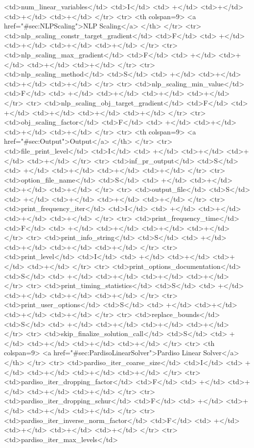 {{<td>num_linear_variables</td>
<td>I</td>
<td> +</td>
<td>+</td>
<td>+</td>
<td>+</td>
</tr>
<tr>   <th colspan=9> <a href="#sec:NLPScaling">NLP Scaling</a> </th>
</tr>
<tr>
<td>nlp_scaling_constr_target_gradient</td>
<td>F</td>
<td> +</td>
<td>+</td>
<td>+</td>
<td>+</td>
</tr>
<tr>
<td>nlp_scaling_max_gradient</td>
<td>F</td>
<td> +</td>
<td>+</td>
<td>+</td>
<td>+</td>
</tr>
<tr>
<td>nlp_scaling_method</td>
<td>S</td>
<td> +</td>
<td>+</td>
<td>+</td>
<td>+</td>
</tr>
<tr>
<td>nlp_scaling_min_value</td>
<td>F</td>
<td> +</td>
<td>+</td>
<td>+</td>
<td>+</td>
</tr>
<tr>
<td>nlp_scaling_obj_target_gradient</td>
<td>F</td>
<td> +</td>
<td>+</td>
<td>+</td>
<td>+</td>
</tr>
<tr>
<td>obj_scaling_factor</td>
<td>F</td>
<td> +</td>
<td>+</td>
<td>+</td>
<td>+</td>
</tr>
<tr>   <th colspan=9> <a href="#sec:Output">Output</a> </th>
</tr>
<tr>
<td>file_print_level</td>
<td>I</td>
<td> +</td>
<td>+</td>
<td>+</td>
<td>+</td>
</tr>
<tr>
<td>inf_pr_output</td>
<td>S</td>
<td> +</td>
<td>+</td>
<td>+</td>
<td>+</td>
</tr>
<tr>
<td>option_file_name</td>
<td>S</td>
<td> +</td>
<td>+</td>
<td>+</td>
<td>+</td>
</tr>
<tr>
<td>output_file</td>
<td>S</td>
<td> +</td>
<td>+</td>
<td>+</td>
<td>+</td>
</tr>
<tr>
<td>print_frequency_iter</td>
<td>I</td>
<td> +</td>
<td>+</td>
<td>+</td>
<td>+</td>
</tr>
<tr>
<td>print_frequency_time</td>
<td>F</td>
<td> +</td>
<td>+</td>
<td>+</td>
<td>+</td>
</tr>
<tr>
<td>print_info_string</td>
<td>S</td>
<td> +</td>
<td>+</td>
<td>+</td>
<td>+</td>
</tr>
<tr>
<td>print_level</td>
<td>I</td>
<td> +</td>
<td>+</td>
<td>+</td>
<td>+</td>
</tr>
<tr>
<td>print_options_documentation</td>
<td>S</td>
<td> +</td>
<td>+</td>
<td>+</td>
<td>+</td>
</tr>
<tr>
<td>print_timing_statistics</td>
<td>S</td>
<td> +</td>
<td>+</td>
<td>+</td>
<td>+</td>
</tr>
<tr>
<td>print_user_options</td>
<td>S</td>
<td> +</td>
<td>+</td>
<td>+</td>
<td>+</td>
</tr>
<tr>
<td>replace_bounds</td>
<td>S</td>
<td> +</td>
<td>+</td>
<td>+</td>
<td>+</td>
</tr>
<tr>
<td>skip_finalize_solution_call</td>
<td>S</td>
<td> +</td>
<td>+</td>
<td>+</td>
<td>+</td>
</tr>
<tr>   <th colspan=9> <a href="#sec:PardisoLinearSolver">Pardiso Linear Solver</a> </th>
</tr>
<tr>
<td>pardiso_iter_coarse_size</td>
<td>I</td>
<td> +</td>
<td>+</td>
<td>+</td>
<td>+</td>
</tr>
<tr>
<td>pardiso_iter_dropping_factor</td>
<td>F</td>
<td> +</td>
<td>+</td>
<td>+</td>
<td>+</td>
</tr>
<tr>
<td>pardiso_iter_dropping_schur</td>
<td>F</td>
<td> +</td>
<td>+</td>
<td>+</td>
<td>+</td>
</tr>
<tr>
<td>pardiso_iter_inverse_norm_factor</td>
<td>F</td>
<td> +</td>
<td>+</td>
<td>+</td>
<td>+</td>
</tr>
<tr>
<td>pardiso_iter_max_levels</td>
}}
